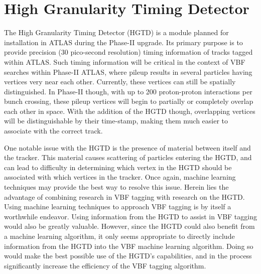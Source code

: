 \documentclass[12pt,letterpaper]{article}
\begin{document}
\section*{High Granularity Timing Detector}
    The High Granularity Timing Detector (HGTD) is a module planned for installation in ATLAS during the Phase-II upgrade. Its primary purpose is to provide precision (30 pico-second resolution) timing information of tracks tagged within ATLAS. Such timing information will be critical in the context of VBF searches within Phase-II ATLAS, where pileup results in several particles having vertices very near each other. Currently, these vertices can still be spatially distinguished. In Phase-II though, with up to 200 proton-proton interactions per bunch crossing, these pileup vertices will begin to partially or completely overlap each other in space. With the addition of the HGTD though, overlapping vertices will be distinguishable by their time-stamp, making them much easier to associate with the correct track. 
    
    One notable issue with the HGTD is the presence of material between itself and the tracker. This material causes scattering of particles entering the HGTD, and can lead to difficulty in determining which vertex in the HGTD should be associated with which vertices in the tracker. Once again, machine learning techniques may provide the best way to resolve this issue. Herein lies the advantage of combining research in VBF tagging with research on the HGTD. Using machine learning techniques to approach VBF tagging is by itself a worthwhile endeavor. Using information from the HGTD to assist in VBF tagging would also be greatly valuable. However, since the HGTD could also benefit from a machine learning algorithm, it only seems appropriate to directly include information from the HGTD into the VBF machine learning algorithm. Doing so would make the best possible use of the HGTD's capabilities, and in the process significantly increase the efficiency of the VBF tagging algorithm.



\end{document}
